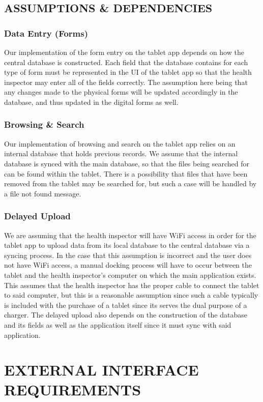 \documentclass[twoside,letterpaper]{article}
\begin{document}
\subsection[ASSUMPTIONS \& DEPENDENCIES]{\rmfamily\bfseries\color{black}
ASSUMPTIONS \& DEPENDENCIES}
\subsubsection{Data Entry (Forms)}
Our implementation of the form entry on the tablet app depends on how the central database is constructed. Each field that the database contains for each type of form must be represented in the UI of the tablet app so that the health inspector may enter all of the fields correctly. The assumption here being that any changes made to the physical forms will be updated accordingly in the database, and thus updated in the digital forms as well. 
\subsubsection{Browsing \& Search}
Our implementation of browsing and search on the tablet app relies on an internal database that holds previous records. We assume that the internal database is synced with the main database, so that the files being searched for can be found within the tablet. There is a possibility that files that have been removed from the tablet may be searched for, but such a case will be handled by a file not found message. 
\subsubsection{Delayed Upload}
We are assuming that the health inspector will have WiFi access in order for the tablet app to upload data from its local database to the central database via a syncing process. In the case that this assumption is incorrect and the user does not have WiFi access, a manual docking process will have to occur between the tablet and the health inspector's computer on which the main application exists. This assumes that the health inspector has the proper cable to connect the tablet to said computer, but this is a reasonable assumption since such a cable typically is included with the purchase of a tablet since its serves the dual purpose of a charger. The delayed upload also depends on the construction of the database and its fields as well as the application itself since it must sync with said application.

\clearpage\section[EXTERNAL INTERFACE
REQUIREMENTS]{\rmfamily\bfseries\color{black}
EXTERNAL INTERFACE
REQUIREMENTS}
\end{document}
